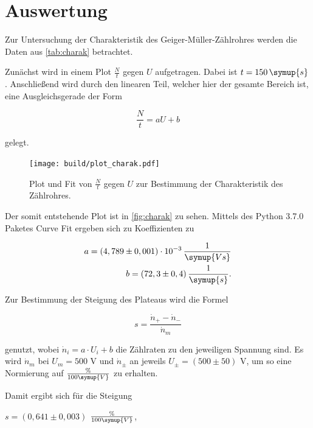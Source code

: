 \section{Auswertung}
\label{sec:Auswertung}

Zur Untersuchung der Charakteristik des Geiger-Müller-Zählrohres werden die Daten aus \autoref{tab:charak} betrachtet.



Zunächst wird in einem Plot $\frac{N}{t}$ gegen $U$ aufgetragen. Dabei ist $t = 150 \, \symup{s}$.
Anschließend wird durch den linearen Teil, welcher hier der gesamte Bereich ist, eine Ausgleichsgerade der Form

\begin{equation}
    \frac{N}{t} = a U + b
\end{equation}

gelegt.

\begin{figure}
  \centering
  \texttt{[image: build/plot\_charak.pdf]}
  \caption{Plot und Fit von $\frac{N}{t}$ gegen $U$ zur Bestimmung der Charakteristik des Zählrohres.}
  \label{fig:charak}
\end{figure}

Der somit entstehende Plot ist in \autoref{fig:charak} zu sehen.
Mittels des Python 3.7.0 Paketes Curve Fit ergeben sich zu Koeffizienten zu

\begin{align*}
    a = (4,789 \pm 0,001) \cdot 10^{-3} \, \frac{1}{\symup{Vs}}\\
    b = (72,3 \pm 0,4) \, \frac{1}{\symup{s}}.
\end{align*}

Zur Bestimmung der Steigung des Plateaus wird die Formel

\begin{equation}
    s = \frac{\dot{n}_+ - \dot{n}_-}{\dot{n}_m}
\end{equation}

genutzt, wobei $\dot{n}_i = a \cdot U_i + b$ die Zählraten zu den jeweiligen Spannung sind.
Es wird $\dot{n}_m$ bei $U_m = 500$ V und $\dot{n}_\pm$ an jeweils $U_\pm = (500 \pm 50)$ V, um so eine Normierung auf $\frac{\%}{100\symup{V}}$ zu erhalten.

Damit ergibt sich für die Steigung

\begin{center}
    $s = (0,641 \pm 0,003)$ $\frac{\%}{100\symup{V}}$,
\end{center}

